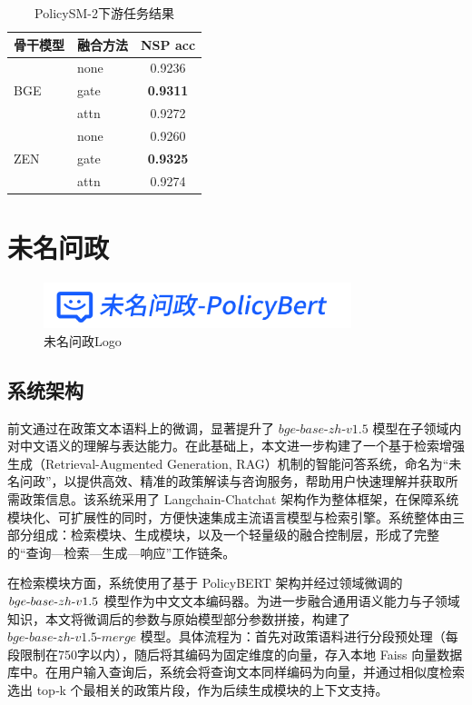 \documentclass[12pt, a4paper]{ctexart}
\begin{document}
  \begin{table}[htbp]
    \renewcommand{\arraystretch}{1}
    \centering
    \caption{PolicySM-2下游任务结果}
    \begin{tabular}{llc}
      \toprule
      骨干模型 & 融合方法 & NSP acc \\
      \midrule
      \multirow{3}{*}{BGE}
        & none & 0.9236 \\
        & gate & \textbf{0.9311} \\
        & attn & 0.9272 \\
      \midrule
      \multirow{3}{*}{ZEN}
        & none & 0.9260 \\
        & gate & \textbf{0.9325} \\
        & attn & 0.9274 \\
      \bottomrule
    \end{tabular}
    \label{tab:nsp-results}
  \end{table}

\newpage
\section{未名问政}
\begin{figure}[H]
    \centering
    \includegraphics[width=0.8\textwidth]{./images/WeiMingPolicyLogo.png}
    \caption{未名问政Logo}
    \label{fig:WeiMingLogo}
\end{figure}

\subsection{系统架构}

前文通过在政策文本语料上的微调，显著提升了 $bge\text{-}base\text{-}zh\text{-}v1.5$ 模型在子领域内对中文语义的理解与表达能力。在此基础上，本文进一步构建了一个基于检索增强生成（Retrieval-Augmented Generation, RAG）机制的智能问答系统，命名为“未名问政”，以提供高效、精准的政策解读与咨询服务，帮助用户快速理解并获取所需政策信息。该系统采用了 Langchain-Chatchat 架构作为整体框架，在保障系统模块化、可扩展性的同时，方便快速集成主流语言模型与检索引擎。系统整体由三部分组成：检索模块、生成模块，以及一个轻量级的融合控制层，形成了完整的“查询—检索—生成—响应”工作链条。

在检索模块方面，系统使用了基于 PolicyBERT 架构并经过领域微调的 $bge\text{-}base\text{-}\\zh\text{-}v1.5$ 模型作为中文文本编码器。为进一步融合通用语义能力与子领域知识，本文将微调后的参数与原始模型部分参数拼接，构建了 $bge\text{-}base\text{-}zh\text{-}v1.5\text{-}merge$ 模型。具体流程为：首先对政策语料进行分段预处理（每段限制在750字以内），随后将其编码为固定维度的向量，存入本地 Faiss 向量数据库中。在用户输入查询后，系统会将查询文本同样编码为向量，并通过相似度检索选出 top‑k 个最相关的政策片段，作为后续生成模块的上下文支持。
\end{document}
